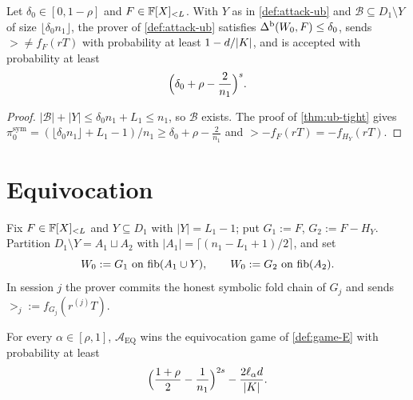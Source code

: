 \begin{theorem}\label{thm:promise-attack}
Let $\delta_0\in[0,1-\rho]$ and $F\in\mathbb{F}[X]_{<L}$. With $Y$ as in
\cref{def:attack-ub} and $\mathcal B\subseteq D_1\setminus Y$ of size
$\lfloor\delta_0n_1\rfloor$, the prover of \cref{def:attack-ub} satisfies
$\Delta^{\mathrm{b}}(W_0,F)\le\delta_0$, sends $\gt\ne f_F(rT)$ with probability at least $1-d/|K|$, and
is accepted with probability at least
\[
\Bigl(\delta_0+\rho-\frac2{n_1}\Bigr)^{s}.
\]
\end{theorem}

\begin{proof}
$|\mathcal B|+|Y|\le\delta_0n_1+L_1\le n_1$, so $\mathcal B$ exists. The proof of
\cref{thm:ub-tight} gives $\pi^{\mathrm{sym}}_0=(\lfloor\delta_0n_1\rfloor+L_1-1)/n_1
\ge\delta_0+\rho-\frac2{n_1}$ and $\gt-f_F(rT)=-f_{H_Y}(rT)$.
\end{proof}

\section{Equivocation}

\begin{definition}\label{def:attack-eq}
Fix $F\in\mathbb{F}[X]_{<L}$ and $Y\subseteq D_1$ with $|Y|=L_1-1$; put $G_1:=F$,
$G_2:=F-H_Y$. Partition $D_1\setminus Y=A_1\sqcup A_2$ with
$|A_1|=\lceil(n_1-L_1+1)/2\rceil$, and set
\[
W_0:=G_1\ \text{on}\ \mathrm{fib}(A_1\cup Y),\qquad W_0:=G_2\ \text{on}\ \mathrm{fib}(A_2).
\]
In session $j$ the prover commits the honest symbolic fold chain of $G_j$ and sends
$\gt_j:=f_{G_j}(r^{(j)}T)$.
\end{definition}

\begin{theorem}\label{thm:eq-attack}
For every $\alpha\in[\rho,1]$, $\mathcal A_{\mathrm{EQ}}$ wins the equivocation game of
\cref{def:game-E} with probability at least
\[
\Bigl(\frac{1+\rho}2-\frac1{n_1}\Bigr)^{2s}-\frac{2\ell_\alpha d}{|K|}.
\]
\end{theorem}

